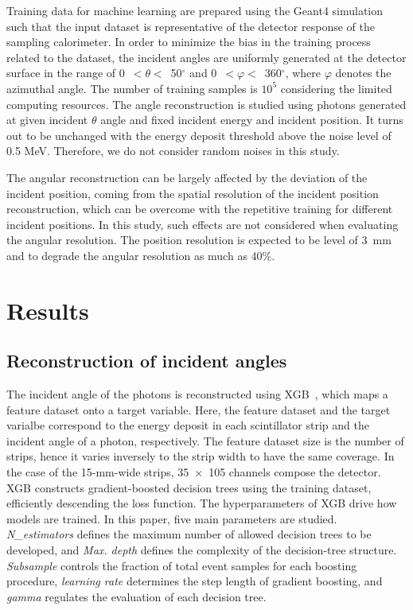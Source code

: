 \documentclass[12pt,times,draftclsnofoot,a4paper]{elsarticle}
\begin{document}
Training data for machine learning are prepared using the Geant4 simulation such that the input dataset is representative of the detector response of the sampling calorimeter. In order to minimize the bias in the training process related to the dataset, the incident angles are uniformly generated at the detector surface in the range of 0~$<\theta<$~50$^{\circ}$ and 0~$<\varphi<$~360$^{\circ}$, where $\varphi$ denotes the azimuthal angle. The number of training samples is $10^{5}$ considering the limited computing resources. The angle reconstruction is studied using photons generated at given incident $\theta$ angle and fixed incident energy and incident position. It turns out to be unchanged with the energy deposit threshold above the noise level of 0.5 MeV. Therefore, we do not consider random noises in this study.

The angular reconstruction can be largely affected by the deviation of the incident position, coming from the spatial resolution of the incident position reconstruction, which can be overcome with the repetitive training for different incident positions. In this study, such effects are not considered when evaluating the angular resolution. The position resolution is expected to be level of 3~mm and to degrade the angular resolution as much as 40\%. 

\section{Results}
\label{sec:res}
\subsection{Reconstruction of incident angles}
\label{sec:reco}

The incident angle of the photons is reconstructed using XGB~\cite{xgboost:2016}, which maps a feature dataset onto a target variable. Here, the feature dataset and the target varialbe correspond to the energy deposit in each scintillator strip and the incident angle of a photon, respectively. The feature dataset size is the number of strips, hence it varies inversely to the strip width to have the same coverage. In the case of the 15-mm-wide strips, 35~$\times$~105 channels compose the detector. XGB constructs gradient-boosted decision trees using the training dataset, efficiently descending the loss function. The hyperparameters of XGB drive how models are trained. In this paper, five main parameters are studied. \textit{N\_estimators} defines the maximum number of allowed decision trees to be developed, and \textit{Max. depth} defines the complexity of the decision-tree structure. \textit{Subsample} controls the fraction of total event samples for each boosting procedure, \textit{learning rate} determines the step length of gradient boosting, and \textit{gamma} regulates the evaluation of each decision tree.
\end{document}
